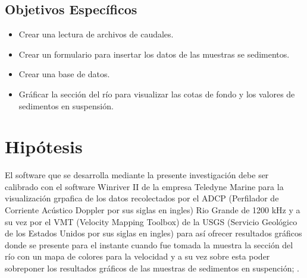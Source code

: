\documentclass[12pt,a4paper]{report}
\begin{document}
	\subsection{Objetivos Específicos}
	\begin{itemize}
	\item Crear una lectura de archivos de caudales.
	\item Crear un formulario para insertar los datos de las muestras se sedimentos.
	\item Crear una base de datos.
	\item Gráficar la sección del río para visualizar las cotas de fondo y los valores de sedimentos en suspensión.
	\end{itemize}

\section{Hipótesis}
	El software que se desarrolla mediante la presente investigación debe ser calibrado con el software Winriver II de la empresa Teledyne Marine para la visualización grpafica de los datos recolectados por el ADCP (Perfilador de Corriente Acústico Doppler por sus siglas en ingles) Rio Grande de 1200 kHz y a su vez por el VMT (Velocity Mapping Toolbox) de la USGS (Servicio Geológico de los Estados Unidos por sus siglas en ingles) para así ofrecer resultados gráficos donde se presente para el instante cuando fue tomada la muestra la sección del río con un mapa de colores para la velocidad y a su vez sobre esta poder sobreponer los resultados gráficos de las muestras de sedimentos en suspención; .
\end{document}
